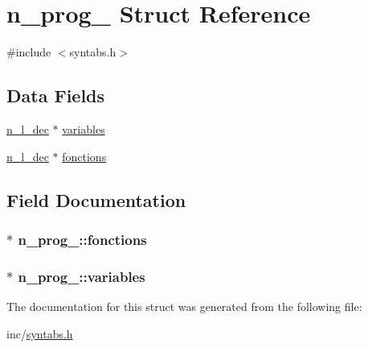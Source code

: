 \hypertarget{structn__prog__}{}\section{n\+\_\+prog\+\_\+ Struct Reference}
\label{structn__prog__}


{\ttfamily \#include $<$syntabs.\+h$>$}

\subsection*{Data Fields}
\begin{DoxyCompactItemize}
\item 
\hyperlink{syntabs_8h_ab260b396f6175518fe4d37ca38ded54e}{n\+\_\+l\+\_\+dec} $\ast$ \hyperlink{structn__prog___a81d57cc27bef2b1cd9ccc01c6679e71c}{variables}
\item 
\hyperlink{syntabs_8h_ab260b396f6175518fe4d37ca38ded54e}{n\+\_\+l\+\_\+dec} $\ast$ \hyperlink{structn__prog___a29a2b1f0931d05dcb725a05fb610f9ca}{fonctions}
\end{DoxyCompactItemize}


\subsection{Field Documentation}
\subsubsection[{\texorpdfstring{fonctions}{fonctions}}]{$\ast$ n\+\_\+prog\+\_\+\+::fonctions}\hypertarget{structn__prog___a29a2b1f0931d05dcb725a05fb610f9ca}{}\label{structn__prog___a29a2b1f0931d05dcb725a05fb610f9ca}
\subsubsection[{\texorpdfstring{variables}{variables}}]{$\ast$ n\+\_\+prog\+\_\+\+::variables}\hypertarget{structn__prog___a81d57cc27bef2b1cd9ccc01c6679e71c}{}\label{structn__prog___a81d57cc27bef2b1cd9ccc01c6679e71c}


The documentation for this struct was generated from the following file\+:\begin{DoxyCompactItemize}
\item 
inc/\hyperlink{syntabs_8h}{syntabs.\+h}\end{DoxyCompactItemize}
